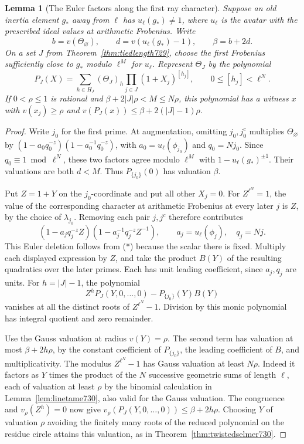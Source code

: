 \documentclass[a4paper,11pt]{article}
\newtheorem{lemma}[proposition]{Lemma}
\theoremstyle{definition}
\theoremstyle{remark}
\numberwithin{equation}{section}
\begin{document}
\begin{lemma}[The Euler factors along the first ray character]
\leavevmode\label{lem:criticalwitness731}
Suppose an old inertia element \(g_*\) away from \(\ell\) has
\(u_\ell(g_*)\ne1\), where \(u_\ell\) is the avatar with the
prescribed ideal values at arithmetic Frobenius. Write
\[
    b=v(\Theta_\varnothing),\qquad
    d=v(u_\ell(g_*)-1),\qquad \beta=b+2d .
\]
On a set \(J\) from Theorem~\ref{thm:tiedlength729}, choose the
first Frobenius sufficiently close to \(g_*\) modulo \(\ell^M\)
for \(u_\ell\). Represent \(\Theta_J\) by the polynomial
\[
   P_J(X)=\sum_{h\in H_J}(\Theta_J)_h
                       \prod_{j\in J}(1+X_j)^{[h_j]},
       \qquad 0\le[h_j]<\ell^N .
\]
If \(0<\rho\le1\) is rational and
\(\beta+2\lvert J\rvert\rho<M\le N\rho\), this polynomial has a
witness \(x\) with \(v(x_j)\ge\rho\) and
\(v(P_J(x))\le\beta+2(\lvert J\rvert-1)\rho\).
\end{lemma}
\begin{proof}
Write \(j_0\) for the first prime. At augmentation, omitting
\(j_0,j_0^c\) multiplies \(\Theta_\varnothing\) by
\((1-a_0q_0^{-z})(1-a_0^{-1}q_0^{-z})\), with
\(a_0=u_\ell(\phi_{j_0})\) and \(q_0=Nj_0\).
Since \(q_0\equiv1\bmod\ell^N\), these two factors agree modulo
\(\ell^M\) with \(1-u_\ell(g_*)^{\pm1}\). Their valuations are
both \(d<M\). Thus \(P_{\{j_0\}}(0)\) has valuation \(\beta\).

Put \(Z=1+Y\) on the \(j_0\)-coordinate and put all other \(X_j=0\).
For \(Z^{\ell^N}=1\), the value of the corresponding character at
arithmetic Frobenius at every later \(j\) is \(Z\), by the choice
of \(\lambda_{j_0}\). Removing each pair \(j,j^c\) therefore
contributes
\[
   (1-a_j q_j^{-z}Z)(1-a_j^{-1}q_j^{-z}Z^{-1}),
   \qquad a_j=u_\ell(\phi_j),\quad q_j=Nj .
\]
This Euler deletion follows from (*) because the scalar there is
fixed. Multiply each displayed expression by \(Z\), and take the
product \(B(Y)\) of the resulting quadratics over the later primes.
Each has unit leading coefficient, since \(a_j,q_j\) are units.
For \(h=\lvert J\rvert-1\), the polynomial
\[
 Z^h P_J(Y,0,\ldots,0)-P_{\{j_0\}}(Y)B(Y)
\]
vanishes at all the distinct roots of \(Z^{\ell^N}-1\).
Division by this monic polynomial has integral quotient and zero
remainder.

Use the Gauss valuation at radius \(v(Y)=\rho\). The second term
has valuation at most \(\beta+2h\rho\), by the constant coefficient
of \(P_{\{j_0\}}\), the leading coefficient of \(B\), and
multiplicativity. The modulus \(Z^{\ell^N}-1\) has Gauss valuation
at least \(N\rho\). Indeed it factors as \(Y\) times the product of
the \(N\) successive geometric sums of length \(\ell\), each of
valuation at least \(\rho\) by the binomial calculation in
Lemma~\ref{lem:linetame730}, also valid for the Gauss valuation.
The congruence and \(v_\rho(Z^h)=0\) now give
\(v_\rho(P_J(Y,0,\ldots,0))\le\beta+2h\rho\).
Choosing \(Y\) of valuation \(\rho\) avoiding the finitely many
roots of the reduced polynomial on the residue circle attains this
valuation, as in Theorem~\ref{thm:twistedselmer730}.
\end{proof}
\end{document}
